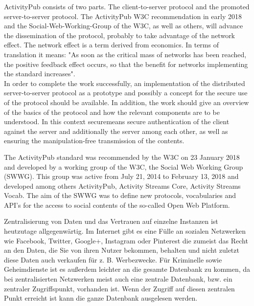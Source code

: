 {	ActivityPub consists of two parts. The client-to-server protocol and the promoted server-to-server protocol. The ActivityPub W3C recommendation in early 2018 and the Social-Web-Working-Group of the W3C, as well as others, will advance the dissemination of the protocol, probably to take advantage of the network effect. The network effect is a term derived from economics. In terms of translation it means: "As soon as the critical mass of networks has been reached, the positive feedback effect occurs, so that the benefit for networks implementing the standard increases".\\
	
	In order to complete the work successfully, an implementation of the distributed server-to-server protocol as a prototype and possibly a concept for the secure use of the protocol should be available. In addition, the work should give an overview of the basics of the protocol and how the relevant components are to be understood. In this context \glqq secure\grqq means secure authentication of the client against the server and additionally the server among each other, as well as ensuring the manipulation-free transmission of the contents.\\
	
	
	The ActivityPub\cite{activityPub} standard was recommended by the W3C on 23 January 2018 and developed by a working group of the W3C, the Social Web Working Group (SWWG)\cite{socialWg,pushSocialWeb}. This group was active from July 21, 2014 to February 13, 2018\cite{socialWg} and developed among others ActivityPub, Activity Streams Core\cite{activityStreamsCore}, Activity Streams Vocab\cite{activityStreamsVocabulary}. The aim of the SWWG was to define new protocols, vocabularies and API's for the access to social contents of the so-called Open Web Platform\cite{social-wg-charter}.

}{
	Zentralisierung von Daten und das Vertrauen auf einzelne Instanzen ist heutzutage allgegenwärtig. Im Internet gibt es eine Fülle an sozialen Netzwerken wie Facebook, Twitter, Google+, Instagram oder Pinterest die zumeist das Recht an den Daten, die Sie von ihren Nutzer bekommen, behalten und nicht zuletzt diese Daten auch verkaufen für z. B. Werbezwecke. Für Kriminelle sowie Geheimdienste ist es außerdem leichter an die gesamte Datenbank zu kommen, da bei zentralisierten Netzwerken meist auch eine zentrale Datenbank, bzw. ein zentraler Zugriffspunkt, vorhanden ist. Wenn der Zugriff auf diesen zentralen Punkt erreicht ist kann die ganze Datenbank ausgelesen werden.\\
	
}
